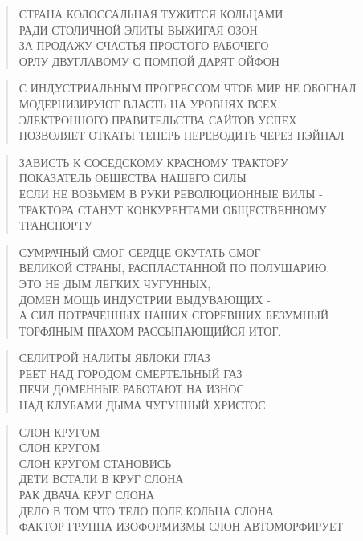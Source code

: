 \poemtitle{***}
\begin{verse}
СТРАНА КОЛОССАЛЬНАЯ ТУЖИТСЯ КОЛЬЦАМИ\\
РАДИ СТОЛИЧНОЙ ЭЛИТЫ ВЫЖИГАЯ ОЗОН\\
ЗА ПРОДАЖУ СЧАСТЬЯ ПРОСТОГО РАБОЧЕГО\\
ОРЛУ ДВУГЛАВОМУ С ПОМПОЙ ДАРЯТ ОЙФОН
\end{verse}

\poemtitle{***}
\begin{verse}
С ИНДУСТРИАЛЬНЫМ ПРОГРЕССОМ ЧТОБ МИР НЕ ОБОГНАЛ\\
МОДЕРНИЗИРУЮТ ВЛАСТЬ НА УРОВНЯХ ВСЕХ\\
ЭЛЕКТРОННОГО ПРАВИТЕЛЬСТВА САЙТОВ УСПЕХ\\
ПОЗВОЛЯЕТ ОТКАТЫ ТЕПЕРЬ ПЕРЕВОДИТЬ ЧЕРЕЗ ПЭЙПАЛ
\end{verse}

\poemtitle{***}
\begin{verse}
ЗАВИСТЬ К СОСЕДСКОМУ КРАСНОМУ ТРАКТОРУ\\
ПОКАЗАТЕЛЬ ОБЩЕСТВА НАШЕГО СИЛЫ\\
ЕСЛИ НЕ ВОЗЬМЁМ В РУКИ РЕВОЛЮЦИОННЫЕ ВИЛЫ - \\
ТРАКТОРА СТАНУТ КОНКУРЕНТАМИ ОБЩЕСТВЕННОМУ ТРАНСПОРТУ
\end{verse}

\poemtitle{***}
\begin{verse}
СУМРАЧНЫЙ СМОГ СЕРДЦЕ ОКУТАТЬ СМОГ\\
ВЕЛИКОЙ СТРАНЫ, РАСПЛАСТАННОЙ ПО ПОЛУШАРИЮ.\\
ЭТО НЕ ДЫМ ЛЁГКИХ ЧУГУННЫХ, \\
ДОМЕН МОЩЬ ИНДУСТРИИ ВЫДУВАЮЩИХ -\\
А СИЛ ПОТРАЧЕННЫХ НАШИХ СГОРЕВШИХ БЕЗУМНЫЙ \\
ТОРФЯНЫМ ПРАХОМ РАССЫПАЮЩИЙСЯ ИТОГ.
\end{verse}

\poemtitle{***}
\begin{verse}
СЕЛИТРОЙ НАЛИТЫ ЯБЛОКИ ГЛАЗ\\
РЕЕТ НАД ГОРОДОМ СМЕРТЕЛЬНЫЙ ГАЗ\\
ПЕЧИ ДОМЕННЫЕ РАБОТАЮТ НА ИЗНОС\\
НАД КЛУБАМИ ДЫМА ЧУГУННЫЙ ХРИСТОС
\end{verse}

\poemtitle{***}
\begin{verse}
СЛОН КРУГОМ\\
СЛОН КРУГОМ\\
СЛОН КРУГОМ СТАНОВИСЬ\\
ДЕТИ ВСТАЛИ В КРУГ СЛОНА\\
РАК ДВАЧА КРУГ СЛОНА\\
ДЕЛО В ТОМ ЧТО ТЕЛО ПОЛЕ КОЛЬЦА СЛОНА\\
ФАКТОР ГРУППА ИЗОФОРМИЗМЫ СЛОН АВТОМОРФИРУЕТ
\end{verse}

